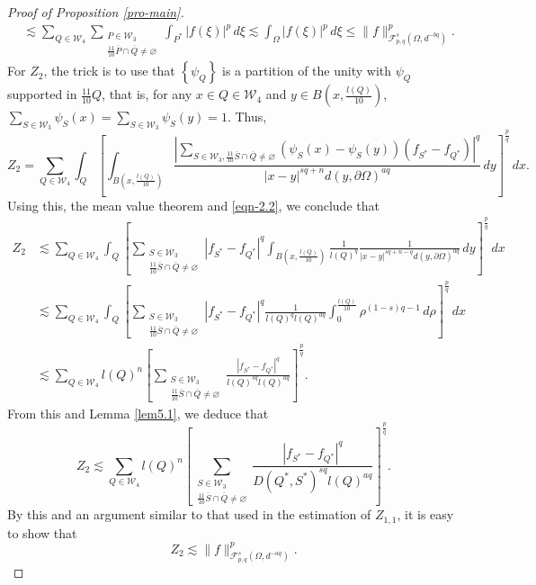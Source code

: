 \documentclass[11pt,twoside]{article}
\def\cf{{\mathcal F}}
\def\cw{\mathcal W}
\def\sxing{S^{*}}
\def\qxing{Q^{*}}
\def\boz{{\Omega}}
\def\pa{\partial}                %
\theoremstyle{mylem}
\theoremstyle{definition}
\numberwithin{equation}{section}
\begin{document}
\begin{proof}[Proof of Proposition \ref{pro-main}]
\begin{align}
&\lesssim \sum_{Q\in\cw_4}  \sum_{\substack{P\in\mathcal{W}_3\\ \frac{11}{10}\overline{P}\cap\overline{Q} \neq\varnothing}} \int_{P^{*}} |f(\xi)|^p \,d\xi
\lesssim \int_{\boz} |f(\xi)|^p\,d\xi
\leq \| f \|_{\cf_{p,q}^{s}(\boz,d^{-bq})}^{p}.
\end{align}
For $Z_2$, the trick is to use that $\left\{\psi_Q \right\}$ is a partition of the unity with $\psi_Q$ supported in $\frac{11}{10}Q$, that is, for any $x\in Q\in\cw_4$ and $y\in B(x,\frac{l(Q)}{10})$, $\sum_{S\in\mathcal{W}_3}\psi_S(x)=\sum_{S\in\mathcal{W}_3}\psi_S(y)=1$. Thus,
\[
Z_2=\sum_{Q\in\cw_4} \int_{Q} \left[ \int_{ B(x,\frac{l(Q)}{10})} \frac{| \sum_{S\in\mathcal{W}_3, \frac{11}{10}\overline{S}\cap\overline{Q} \neq\varnothing} (\psi_S(x)-\psi_S(y))(f_{S^{*}}-f_{\qxing})|^q}{|x - y|^{s q + n}d(y,\pa\boz)^{aq}}\,dy \right]^{\frac{p}{q}}\,dx.
\]
Using this, the mean value theorem and \eqref{eqn-2.2}, we conclude that
\begin{align*}
Z_2&\lesssim \sum_{Q\in\cw_4} \int_{Q} \left[ \sum_{\substack{S\in\mathcal{W}_3\\ \frac{11}{10}\overline{S}\cap\overline{Q} \neq\varnothing}} |f_{S^{*}}-f_{\qxing}|^q \int_{ B(x,\frac{l(Q)}{10})} \frac{1}{l(Q)^q} \frac{1}{|x - y|^{s q + n-q}d(y,\pa\boz)^{aq}}\,dy \right]^{\frac{p}{q}}\,dx \\
&\lesssim \sum_{Q\in\cw_4} \int_{Q} \left[ \sum_{\substack{S\in\mathcal{W}_3\\ \frac{11}{10}\overline{S}\cap\overline{Q} \neq\varnothing}} |f_{S^{*}}-f_{\qxing}|^q \frac{1}{l(Q)^q l(Q)^{aq}}\int_{ 0}^{\frac{l(Q)}{10}} \rho^{(1-s)q-1}\,d\rho \right]^{\frac{p}{q}}\,dx \\
&\lesssim \sum_{Q\in\cw_4} l(Q)^n \left[ \sum_{\substack{S\in\mathcal{W}_3\\ \frac{11}{10}\overline{S}\cap\overline{Q} \neq\varnothing}}\frac{ |f_{S^{*}}-f_{\qxing}|^q }{l(Q)^{sq} l(Q)^{aq}} \right]^{\frac{p}{q}}.
\end{align*}
From this and Lemma \ref{lem5.1}, we deduce that
\[
Z_2 \lesssim \sum_{Q\in\cw_4} l(Q)^n \left[ \sum_{\substack{S\in\mathcal{W}_3\\ \frac{11}{10}\overline{S}\cap\overline{Q} \neq\varnothing}}\frac{ |f_{S^{*}}-f_{\qxing}|^q }{D(\qxing,\sxing)^{sq} l(Q)^{aq}} \right]^{\frac{p}{q}}.
\]
By this and an argument similar to that used in the estimation of $Z_{1,1}$, it is easy to show that
\begin{equation}\label{eqn-3.15}
Z_2\lesssim \| f \|_{\cf_{p,q}^{s}(\boz,d^{-aq})}^{p}.

\end{equation}
\end{proof}
\end{document}
